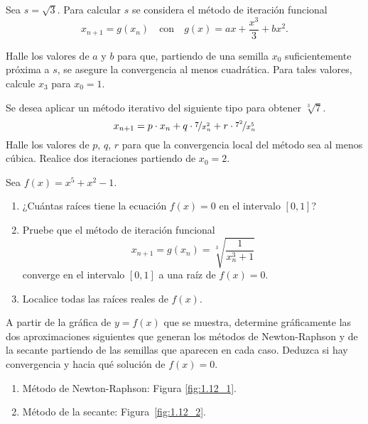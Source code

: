 \begin{ejercicio}\label{ej:1.9}
    Sea $s = \sqrt{3}$. Para calcular $s$ se considera el método de iteración funcional 
    \begin{equation*}
        x_{n+1} = g(x_n) \quad \text{con} \quad g(x) = ax + \frac{x^3}{3} + bx^2.
    \end{equation*}

    Halle los valores de $a$ y $b$ para que, partiendo de una semilla $x_0$ suficientemente próxima a $s$, se asegure la convergencia al menos cuadrática. Para tales valores, calcule $x_3$ para $x_0 = 1$.
\end{ejercicio}

\begin{ejercicio}\label{ej:1.10}
    Se desea aplicar un método iterativo del siguiente tipo para obtener $\sqrt[3]{7}$.
    $$x_{n+1} = p\cdot x_n + q\cdot \nicefrac{7}{x^2_n} + r\cdot \nicefrac{7^2}{x^5_n}$$
    Halle los valores de $p$, $q$, $r$ para que la convergencia local del método sea al menos cúbica. Realice dos iteraciones partiendo de $x_0 = 2$.
\end{ejercicio}

\begin{ejercicio}\label{ej:1.11}
    Sea $f(x) = x^5 + x^2 - 1$.
    \begin{enumerate}
        \item ¿Cuántas raíces tiene la ecuación $f(x) = 0$ en el intervalo $[0, 1]$?
        \item Pruebe que el método de iteración funcional
        $$x_{n+1} = g(x_n) = \sqrt[3]{\dfrac{1}{x_n^3+1}}$$
        converge en el intervalo $[0, 1]$ a una raíz de $f(x) = 0$.
        \item Localice todas las raíces reales de $f(x)$.
    \end{enumerate}
\end{ejercicio}

\begin{ejercicio}\label{ej:1.12}
    A partir de la gráfica de $y = f(x)$ que se muestra, determine gráficamente las dos aproximaciones siguientes que generan los métodos de Newton-Raphson y de la secante partiendo de las semillas que aparecen en cada caso. Deduzca si hay convergencia y hacia qué solución de $f(x) = 0$.
    \begin{enumerate}
        \item Método de Newton-Raphson: Figura \ref{fig:1.12_1}.
        \item Método de la secante: Figura~\ref{fig:1.12_2}.
    \end{enumerate}
\end{ejercicio}


